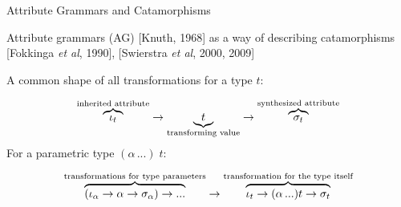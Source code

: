 \documentclass{beamer}
\theoremstyle{definition}
\theoremstyle{plain} %
\begin{document}
\begin{comment}
  In our work we borrow some terminology and a meta-approach from the area of attribute grammars. Attribute grammars were
  introduced by Knuth as a mean to express a class of syntax-directed transformations, for which regular context-free
  grammars were not powerful or convenient enough. The similarity between attribute evaluation procedures and datatype-generic
  transformations was addressed multiple times. However, we do not make use of concrete algorithms for various classes of
  attribute grammars; we just consider AG terminology and approach very generic and convenient.

  We deal only with the transformations of types $\iota \to t \to \sigma$, where $\iota$ is a type for inherited attribute,
  $t$~--- a type for transforming data structure, and $\sigma$~--- a type for synthesized attribute. Informally speaking,
  synthesized attribute is the result of a transformation, while inherited~--- some auxiliary value, which may turn out
  to be useful is some specific cases. For parametric types this signature is enriched with similar transformations for
  type parameters. Note, both inherited and synthesized attributes for the transformations of type parameters can
  be different from each other and from those for the main type.

  This is a very generic scheme of transformations. All transformations, expressible in our framework, are
  instances of this scheme, and if a transformation does not fit into it, it cannot be implemented.  
\end{comment}

\begin{frame}[fragile]{Attribute Grammars and Catamorphisms}

  Attribute grammars (AG) [Knuth, 1968] as a way of describing catamorphisms [Fokkinga \emph{et al}, 1990], [Swierstra \emph{et al}, 2000, 2009]
  
  \vskip5mm
  
  A common shape of all transformations for a type $t$:

\[
\overbrace{\iota_t}^{\mbox{\scriptsize inherited attribute}} \to \underbrace{t}_{\mbox{\scriptsize transforming value}} \to \overbrace{\sigma_t}^{\mbox{\scriptsize{synthesized attribute}}}
\]
\vskip5mm
For a parametric type $(\alpha\,...)\;t$:

\[
\overbrace{(\iota_{\alpha} \to \alpha \to \sigma_{\alpha}) \to ...}^{\mbox{\scriptsize transformations for type parameters}}
\to \overbrace{\iota_t \to (\alpha\,...) t \to \sigma_t}^{\mbox{\scriptsize transformation for the type itself}}
\]

\end{frame}
\end{document}

